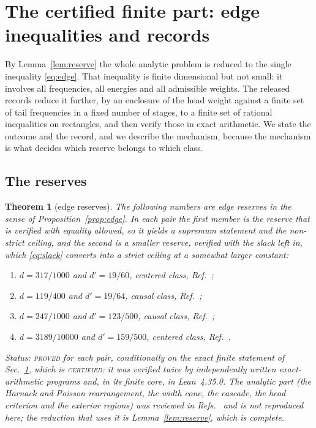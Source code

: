 \documentclass[aps,10pt,superscriptaddress,floatfix,amsmath,amssymb,nofootinbib]{revtex4-2}
\newcommand{\PROVED}{\textsc{proved}}
\newcommand{\CERT}{\textsc{certified}}
\newtheorem{theorem}{Theorem}
\begin{document}
\section{The certified finite part: edge inequalities and records}\label{sec:finite}

By Lemma~\ref{lem:reserve} the whole analytic problem is reduced to the single inequality
\eqref{eq:edge}. That inequality is finite dimensional but not small: it involves all
frequencies, all energies and all admissible weights. The released records reduce it
further, by an enclosure of the head weight against a finite set of tail frequencies in a
fixed number of stages, to a finite set of rational inequalities on rectangles, and then
verify those in exact arithmetic. We state the outcome and the record, and we describe the
mechanism, because the mechanism is what decides which reserve belongs to which class.

\subsection{The reserves}

\begin{theorem}[edge reserves]\label{thm:reserves}
The following numbers are edge reserves in the sense of Proposition~\ref{prop:edge}. In
each pair the first member is the reserve that is verified with equality allowed, so it
yields a supremum statement and the non-strict ceiling, and the second is a smaller reserve,
verified with the slack left in, which \eqref{eq:slack} converts into a strict ceiling at a
somewhat larger constant:
\begin{enumerate}
\item[\rm(a)] $d=317/1000$ and $d'=19/60$, centered class, Ref.~\cite{finiteenergy};
\item[\rm(b)] $d=119/400$ and $d'=19/64$, causal class, Ref.~\cite{finiteenergy};
\item[\rm(c)] $d=247/1000$ and $d'=123/500$, causal class, Ref.~\cite{optimum};
\item[\rm(d)] $d=3189/10000$ and $d'=159/500$, centered class, Ref.~\cite{anisosharp}.
\end{enumerate}
Status: \PROVED{} for each pair, conditionally on the exact finite statement of
Sec.~\ref{sec:finite}, which is \CERT{}: it was verified twice by independently written
exact-arithmetic programs and, in its finite core, in Lean~4.35.0. The analytic part
(the Harnack and Poisson rearrangement, the width cone, the cascade, the head criterion and
the exterior regions) was reviewed in Refs.~\cite{finiteenergy,anisosharp} and is not
reproduced here; the reduction that uses it is Lemma~\ref{lem:reserve}, which is complete.
\end{theorem}
\end{document}
